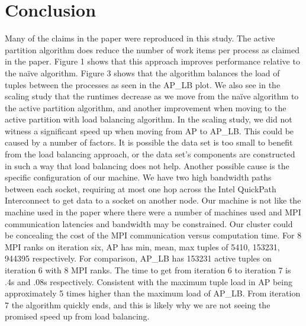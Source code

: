\documentclass[11pt]{amsart}
\begin{document}
\section{Conclusion}
   Many of the claims in the paper were reproduced in this study. The active partition algorithm does reduce the number of work items per process as claimed in the paper. Figure 1 shows that this approach improves performance relative to the na{\"i}ve algorithm. Figure 3 shows that the algorithm balances the load of tuples between the processes as seen in the AP\_LB plot. We also see in the scaling study that the runtimes decrease as we move from the na{\"i}ve algorithm to the active partition algorithm, and another improvement when moving to the active partition with load balancing algorithm.
   In the scaling study, we did not witness a significant speed up when moving from AP to AP\_LB. This could be caused by a number of factors. It is possible the data set is too small to benefit from the load balancing approach, or the data set's components are constructed in such a way that load balancing does not help. Another possible cause is the specific configuration of our machine. We have two high bandwidth paths between each socket, requiring at most one hop across the Intel QuickPath Interconnect to get data to a socket on another node. Our machine is not like the machine used in the paper where there were a number of machines used and MPI communication latencies and bandwidth may be constrained. Our cluster could be concealing the cost of the MPI communication versus computation time. For 8 MPI ranks on iteration six, AP has min, mean, max tuples of 5410, 153231, 944395 respectively. For comparison, AP\_LB has 153231 active tuples on iteration 6 with 8 MPI ranks. The time to get from iteration 6 to iteration 7 is .4s and .08s respectively. Consistent with the maximum tuple load in AP being approximately 5 times higher than the maximum load of AP\_LB. From iteration 7 the algorithm quickly ends, and this is likely why we are not seeing the promised speed up from load balancing.



\end{document}

